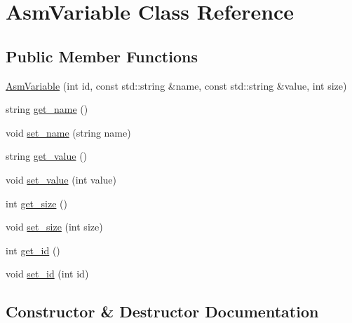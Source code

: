 \hypertarget{class_asm_variable}{}\section{Asm\+Variable Class Reference}
\label{class_asm_variable}
\subsection*{Public Member Functions}
\begin{DoxyCompactItemize}
\item 
\hyperlink{class_asm_variable_af5c77653071bf5fa3cfbf4949267bc10}{Asm\+Variable} (int id, const std\+::string \&name, const std\+::string \&value, int size)
\item 
string \hyperlink{class_asm_variable_a9c535d344d572e06f0470b4676fe8e19}{get\+\_\+name} ()
\item 
void \hyperlink{class_asm_variable_a4f97e9a414c395818c86833c83c8034e}{set\+\_\+name} (string name)
\item 
string \hyperlink{class_asm_variable_a0064d68e6b7f297fb8a53e41a92376cd}{get\+\_\+value} ()
\item 
void \hyperlink{class_asm_variable_a358fbcf8391212b5d6fd160997a6ffbf}{set\+\_\+value} (int value)
\item 
int \hyperlink{class_asm_variable_a73f65c9cd16d725c17889a155eceebfc}{get\+\_\+size} ()
\item 
void \hyperlink{class_asm_variable_a71413e3509f22e29d20e70950f5142e2}{set\+\_\+size} (int size)
\item 
int \hyperlink{class_asm_variable_a47cf53e2cc78e50d30356025d988bf23}{get\+\_\+id} ()
\item 
void \hyperlink{class_asm_variable_a9dc5b226607a2f42c29acff4eee7cf6b}{set\+\_\+id} (int id)
\end{DoxyCompactItemize}


\subsection{Constructor \& Destructor Documentation}
